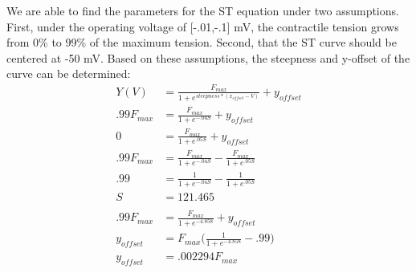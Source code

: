 \documentclass[runningheads,a4paper]{llncs}
\begin{document}
		We are able to find the parameters for the ST equation under two assumptions. First, under the operating voltage of [-.01,-.1] mV, the contractile tension grows from 0\% to 99\% of the maximum tension. Second, that the ST curve should be centered at -50 mV. Based on these assumptions, the steepness and y-offset of the curve can be determined:
		\begin{align*}
			Y(V) &= \frac{F_{max}}{1+e^{steepness*(x_{offset}-V)}}+y_{offset} \\
			 .99F_{max} &= \frac{F_{max}}{1+e^{-.04S}}+y_{offset} \\
			 0 &= \frac{F_{max}}{1+e^{.05S}}+y_{offset} \\
			 .99F_{max} &= \frac{F_{max}}{1+e^{-.04S}} - \frac{F_{max}}{1+e^{.05S}} \\
			 .99 &= \frac{1}{1+e^{-.04S}} - \frac{1}{1+e^{.05S}} \\
			 S &= 121.465 \\
			 \\
			 .99F_{max} &= \frac{F_{max}}{1+e^{-4.858}}+y_{offset} \\
			 y_{offset} &= F_{max}\bigg(\frac{1}{1+e^{-4.858}}-.99\bigg) \\
			 y_{offset} &= .002294 F_{max}
		\end{align*}
\end{document}
